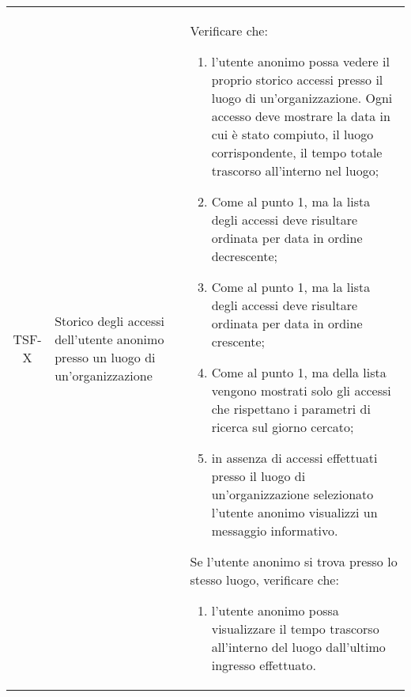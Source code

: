{\begin{longtable}{ c | C{3cm} | C{11cm} }
TSF-X & Storico degli accessi dell'utente anonimo presso un luogo di un'organizzazione & 
Verificare che:    
\begin{enumerate}
    \item l'utente anonimo possa vedere il proprio storico accessi presso il luogo di un'organizzazione. Ogni accesso deve mostrare la data in cui è stato compiuto, il luogo corrispondente, il tempo totale trascorso all'interno nel luogo;
    \item Come al punto 1, ma la lista degli accessi deve risultare ordinata per data in ordine decrescente;
    \item Come al punto 1, ma la lista degli accessi deve risultare ordinata per data in ordine crescente;
    \item Come al punto 1, ma della lista vengono mostrati solo gli accessi che rispettano i parametri di ricerca sul giorno cercato;
    \item in assenza di accessi effettuati presso il luogo di un'organizzazione selezionato l'utente anonimo visualizzi un messaggio informativo.
\end{enumerate}
Se l'utente anonimo si trova presso lo stesso luogo, verificare che:
\begin{enumerate}
    \item l'utente anonimo possa visualizzare il tempo trascorso all'interno del luogo dall'ultimo ingresso effettuato.
\end{enumerate} \\


\end{longtable}}
